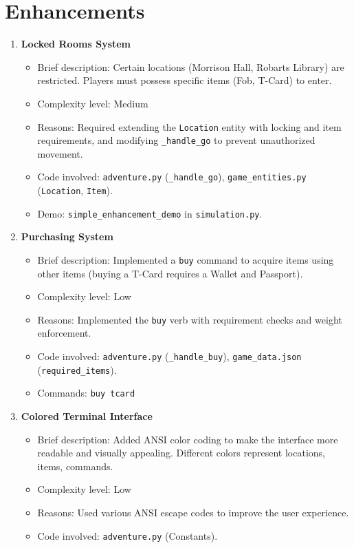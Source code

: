 \documentclass[11pt]{article}
\begin{document}
\section*{Enhancements}
\begin{enumerate}
    \item \textbf{Locked Rooms System}
    \begin{itemize}
        \item Brief description: Certain locations (Morrison Hall, Robarts Library) are restricted. Players must possess specific items (Fob, T-Card) to enter.
        \item Complexity level: Medium
        \item Reasons: Required extending the \texttt{Location} entity with locking and item requirements, and modifying \texttt{_handle_go} to prevent unauthorized movement.
        \item Code involved: \texttt{adventure.py} (\texttt{_handle_go}), \texttt{game_entities.py} (\texttt{Location}, \texttt{Item}).
        \item Demo: \texttt{simple_enhancement_demo} in \texttt{simulation.py}.
    \end{itemize}

    \item \textbf{Purchasing System}
    \begin{itemize}
        \item Brief description: Implemented a \texttt{buy} command to acquire items using other items (buying a T-Card requires a Wallet and Passport).
        \item Complexity level: Low
        \item Reasons: Implemented the \texttt{buy} verb with requirement checks and weight enforcement.
        \item Code involved: \texttt{adventure.py} (\texttt{_handle_buy}), \texttt{game_data.json} (\texttt{required_items}).
        \item Commands: \texttt{buy tcard}
    \end{itemize}

    \item \textbf{Colored Terminal Interface}
    \begin{itemize}
        \item Brief description: Added ANSI color coding to make the interface more readable and visually appealing. Different colors represent locations, items, commands.
        \item Complexity level: Low
        \item Reasons: Used various ANSI escape codes to improve the user experience.
        \item Code involved: \texttt{adventure.py} (Constants).
    \end{itemize}


\end{enumerate}
\end{document}
